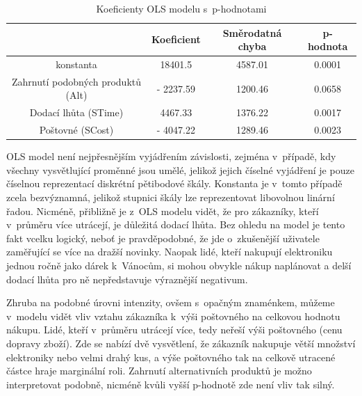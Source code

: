 \documentclass[12pt,twoside,openany]{fithesis}
\begin{document}
            \begin{table}[htb]
                \begin{center}%
                    \begin{tabular}{|c|c|c|c|}
                        \hline 
                        {{}} & {{Koeficient}} & {{Směrodatná chyba}} & {{p-hodnota}} \tabularnewline
                         \hline 
                         {{konstanta}} & {{18401.5}} & {{4587.01}} & {{0.0001}} \tabularnewline
                          \hline 
                          {{Zahrnutí podobných produktů (Alt)}} & {{- 2237.59}} & {{1200.46}} & {{0.0658}} \tabularnewline
                           \hline 
                           {{Dodací lhůta (STime)}} & {{4467.33}} & {{1376.22}} & {{0.0017}} \tabularnewline
                            \hline 
                            {{Poštovné (SCost)}} & {{- 4047.22}} & {{1289.46}} & {{0.0023}} \tabularnewline
                            \hline 
                        \end{tabular}
                        \caption{Koeficienty OLS modelu s~p-hodnotami}\label{tab-ols}
                    \end{center}
                \end{table}

                OLS model není nejpřesnějším vyjádřením závislosti, 
zejména v~případě, kdy všechny vysvětlující proměnné jsou umělé, 
jelikož jejich číselné vyjádření je pouze číselnou reprezentací 
diskrétní pětibodové škály. Konstanta je v~tomto případě zcela 
bezvýznamná, jelikož stupnici škály lze reprezentovat libovolnou linární 
řadou. Nicméně, přibližně je z~OLS modelu vidět, že pro zákazníky, 
kteří v~průměru více utrácejí, je důležitá dodací lhůta. Bez ohledu 
na model je tento fakt vcelku logický, neboť je pravděpodobné, že jde 
o~zkušenější uživatele zaměřující se více na dražší novinky. 
Naopak lidé, kteří nakupují elektroniku jednou ročně jako dárek 
k~Vánocům, si mohou obvykle nákup naplánovat a delší dodací lhůta pro 
ně nepředstavuje výraznější negativum.

                Zhruba na podobné úrovni intenzity, ovšem s~opačným 
znaménkem, můžeme v~modelu vidět vliv vztahu zákazníka k~výši 
poštovného na celkovou hodnotu nákupu. Lidé, kteří v~průměru utrácejí 
více, tedy neřeší výši poštovného (cenu dopravy zboží). Zde se 
nabízí dvě vysvětlení, že zákazník nakupuje větší množství 
elektroniky nebo velmi drahý kus, a výše poštovného tak na celkově 
utracené částce hraje marginální roli. Zahrnutí alternativních produktů 
je možno interpretovat podobně, nicméně kvůli vyšší p-hodnotě zde 
není vliv tak silný.
\end{document}
